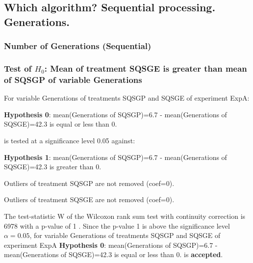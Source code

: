 \documentclass[18pt,c]{beamer}
\begin{document}
\subsection{Which algorithm? Sequential processing. Generations.}
 \begin{frame}
 \fontsize{8pt}{9pt}\selectfont
 \frametitle{ Number of Generations (Sequential) }

 \label{ExpAStatsTable010.tex}  
 \end{frame}

\begin{frame}[t]
 \frametitle{Test of $H_{0}$: Mean of treatment SQSGE is greater than mean of SQSGP of variable Generations }
 \scriptsize
 For variable Generations of treatments SQSGP and SQSGE of experiment ExpA:

\vspace{1mm}
{\bf Hypothesis 0}: mean(Generations of SQSGP)=6.7 - mean(Generations of SQSGE)=42.3 is equal or less than 0.


 \begin{center} is tested at a significance level 0.05 against: \end{center}

{\bf Hypothesis 1}: mean(Generations of SQSGP)=6.7 - mean(Generations of SQSGE)=42.3 is greater than 0.
\vspace{1mm}
\vspace{1mm}

 Outliers of treatment SQSGP  are not removed (coef=0).

 Outliers of treatment SQSGE  are not removed (coef=0).
\vspace{1mm}
 
 The test-statistic W of the Wilcoxon rank sum test with continuity correction is 6978 with a p-value of 1 .
 Since the p-value 1 is above the significance level $\alpha= 0.05 $,
 for variable Generations of treatments SQSGP and SQSGE of experiment ExpA 
 {\bf Hypothesis 0}: mean(Generations of SQSGP)=6.7 - mean(Generations of SQSGE)=42.3 is equal or less than 0.
is {\bf accepted}.

 \end{frame}
\end{document}
